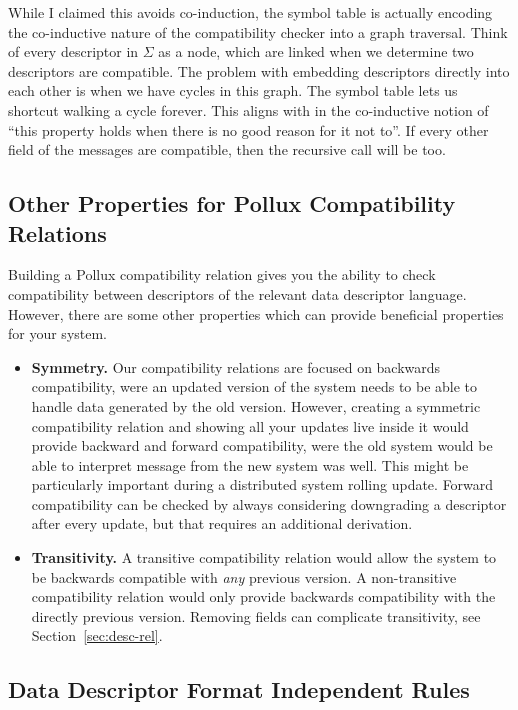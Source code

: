 While I claimed this avoids co-induction, the symbol table is actually encoding
the co-inductive nature of the compatibility checker into a graph
traversal. Think of every descriptor in $\Sigma$ as a node, which are linked when we
determine two descriptors are compatible. The problem with embedding descriptors
directly into each other is when we have cycles in this graph. The symbol table
lets us shortcut walking a cycle forever. This aligns with in the co-inductive
notion of ``this property holds when there is no good reason for it not to''. If
every other field of the messages are compatible, then the recursive call will
be too.

\subsection{Other Properties for Pollux Compatibility Relations}\label{sec:compat-props}

Building a Pollux compatibility relation gives you the ability to check
compatibility between descriptors of the relevant data descriptor
language. However, there are some other properties which can provide beneficial
properties for your system.
\begin{itemize}
\item \textbf{Symmetry.} Our compatibility relations are focused on backwards
  compatibility, were an updated version of the system needs to be able to
  handle data generated by the old version. However, creating a symmetric
  compatibility relation and showing all your updates live inside it would
  provide backward and forward compatibility, were the old system would be able
  to interpret message from the new system was well. This might be particularly
  important during a distributed system rolling update. Forward compatibility
  can be checked by always considering downgrading a descriptor after every
  update, but that requires an additional derivation. 
\item \textbf{Transitivity.} A transitive compatibility relation would allow the
  system to be backwards compatible with \emph{any} previous version. A
  non-transitive compatibility relation would only provide backwards
  compatibility with the directly previous version. Removing fields can
  complicate transitivity, see Section~\ref{sec:desc-rel}.
\end{itemize}

\subsection{Data Descriptor Format Independent Rules}


